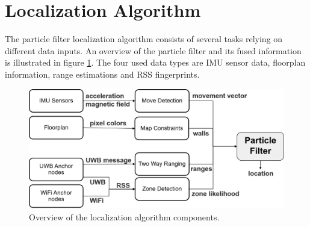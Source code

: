 \section{Localization Algorithm}
The particle filter localization algorithm consists of several tasks relying on different data inputs. An overview of the particle filter and its fused information is illustrated in figure \ref{fig:localization_algorithm}. The four used data types are IMU sensor data, floorplan information, range estimations and RSS fingerprints.\\
\begin{figure}[th]
\centering
\includegraphics[width=1.0\textwidth]{Figures/localization_algorithm}
\decoRule
\caption[Localization Algorithm]{Overview of the localization algorithm components.}
\label{fig:localization_algorithm}
\end{figure}

